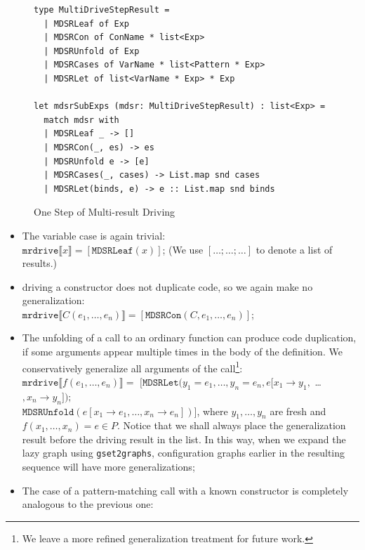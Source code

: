 \documentclass[submission,copyright,creativecommons]{eptcs}
\begin{document}
\begin{figure}
\begin{lstlisting}
type MultiDriveStepResult =
  | MDSRLeaf of Exp
  | MDSRCon of ConName * list<Exp>
  | MDSRUnfold of Exp
  | MDSRCases of VarName * list<Pattern * Exp>
  | MDSRLet of list<VarName * Exp> * Exp

let mdsrSubExps (mdsr: MultiDriveStepResult) : list<Exp> =
  match mdsr with
  | MDSRLeaf _ -> []
  | MDSRCon(_, es) -> es
  | MDSRUnfold e -> [e]
  | MDSRCases(_, cases) -> List.map snd cases
  | MDSRLet(binds, e) -> e :: List.map snd binds
\end{lstlisting}
\caption{One Step of Multi-result Driving}
\label{fig:MultiDriveStepResult}
\end{figure}

\begin{itemize}
  \item The variable case is again trivial: \\
    $\mathtt{mrdrive} \llbracket x \rrbracket = [\mathtt{MDSRLeaf}(x)]$;
    (We use $[\ldots; \ldots; \ldots]$ to denote a list of results.)
  \item driving a constructor does not duplicate code, so we again make no generalization: \\ 
    $\mathtt{mrdrive} \llbracket C(e_1, \ldots, e_n) \rrbracket = [\mathtt{MDSRCon}(C, e_1, \ldots, e_n)]$;
  \item The unfolding of a call to an ordinary function can produce code duplication, if some arguments appear
    multiple times in the body of the definition. 
    We conservatively generalize all arguments of the call\footnote{We leave a more refined generalization treatment for future work.}: \\
    $\mathtt{mrdrive} \llbracket f(e_1, \ldots, e_n) \rrbracket =$ 
      $[\mathtt{MDSRLet}(y_1=e_1, \ldots, y_n=e_n, e [ x_1\rightarrow y_1,$ \ldots$, x_n\rightarrow y_n ]); $ \\
      $\mathtt{MDSRUnfold}(e [ x_1\rightarrow e_1, \ldots, x_n\rightarrow e_n ])]$,
    where $y_1, \ldots, y_n$ are fresh and $f(x_1, \ldots, x_n) = e \in P$.
    Notice that we shall always place the generalization result before the driving result in the list.
    In this way, when we expand the lazy graph using \verb|gset2graphs|, configuration graphs
    earlier in the resulting sequence will have more generalizations;
  \item The case of a pattern-matching call with a known constructor is completely
    analogous to the previous one: \\

\end{itemize}
\end{document}
